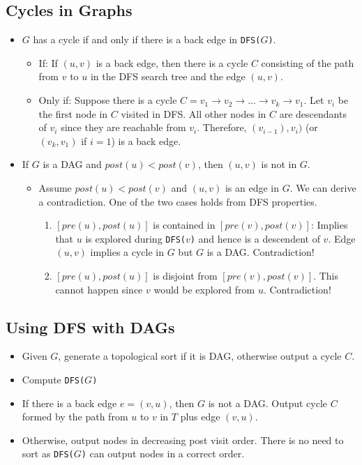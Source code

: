 \subsection{Cycles in Graphs}
\begin{itemize}
    \item $G$ has a cycle if and only if there is a back edge in \texttt{DFS($G$)}.
    \begin{itemize}
        \item If: If $(u, v)$ is a back edge, then there is a cycle $C$ consisting of the path from $v$ to $u$ in the DFS search tree and the edge $(u, v)$.
        \item Only if: Suppose there is a cycle $C = v_1 \rightarrow v_2 \rightarrow ... \rightarrow v_k \rightarrow v_1$. Let $v_i$ be the first node in $C$ visited in DFS. All other nodes in $C$ are descendants of $v_i$ since they are reachable from $v_i$. Therefore, $(v_{i - 1}), v_i)$ (or $(v_k, v_1)$ if $i = 1$) is a back edge.
    \end{itemize}
    \item If $G$ is a DAG and $post(u) < post(v)$, then $(u, v)$ is not in $G$.
    \begin{itemize}
        \item Assume $post(u) < post(v)$ and $(u, v)$ is an edge in $G$. We can derive a contradiction. One of the two cases holds from DFS properties.
        \begin{enumerate}
            \item $[pre(u), post(u)]$ is contained in $[pre(v), post(v)]$: Implies that $u$ is explored during \texttt{DFS($v$)} and hence is a descendent of $v$. Edge $(u, v)$ implies a cycle in $G$ but $G$ is a DAG. Contradiction!
            \item $[pre(u), post(u)]$ is disjoint from $[pre(v), post(v)]$. This cannot happen since $v$ would be explored from $u$. Contradiction!
        \end{enumerate}
    \end{itemize}
\end{itemize}

\subsection{Using DFS with DAGs}
\begin{itemize}
    \item Given $G$, generate a topological sort if it is DAG, otherwise output a cycle $C$.
    \item Compute \texttt{DFS($G$)}
    \item If there is a back edge $e = (v, u)$, then $G$ is not a DAG. Output cycle $C$ formed by the path from $u$ to $v$ in $T$ plus edge $(v, u)$.
    \item Otherwise, output nodes in decreasing post visit order. There is no need to sort as \texttt{DFS($G$)} can output nodes in a correct order.
\end{itemize}

